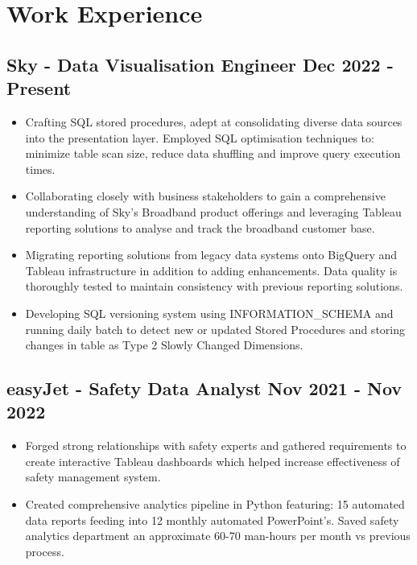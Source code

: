 \documentclass[a4paper,9pt]{article}
\begin{document}
\section*{Work Experience}
\subsection*{\textbf{Sky - Data Visualisation Engineer} \hfill  Dec 2022 - Present}
\begin{itemize}[noitemsep]
    \item Crafting SQL stored procedures, adept at consolidating diverse data sources into the presentation layer. Employed SQL optimisation techniques to: minimize table scan size, reduce data shuffling and improve query execution times.
    \item Collaborating closely with business stakeholders to gain a comprehensive understanding of Sky's Broadband product offerings and leveraging Tableau reporting solutions to analyse and track the broadband customer base.
    \item Migrating reporting solutions from legacy data systems onto BigQuery and Tableau infrastructure in addition to adding enhancements. Data quality is thoroughly tested to maintain consistency with previous reporting solutions.
    \item Developing SQL versioning system using INFORMATION\_SCHEMA and running daily batch to detect new or updated Stored Procedures and storing changes in table as Type 2 Slowly Changed Dimensions.
\end{itemize}

\subsection*{\textbf{easyJet - Safety Data Analyst} \hfill  Nov 2021 - Nov 2022}
\begin{itemize}[noitemsep]
    \item Forged strong relationships with safety experts and gathered requirements to create interactive Tableau dashboards which helped increase effectiveness of safety management system.
    \item Created comprehensive analytics pipeline in Python featuring: 15 automated data reports feeding into 12 monthly automated PowerPoint's. Saved safety analytics department an approximate 60-70 man-hours per month vs previous process.
\end{itemize}
\end{document}
